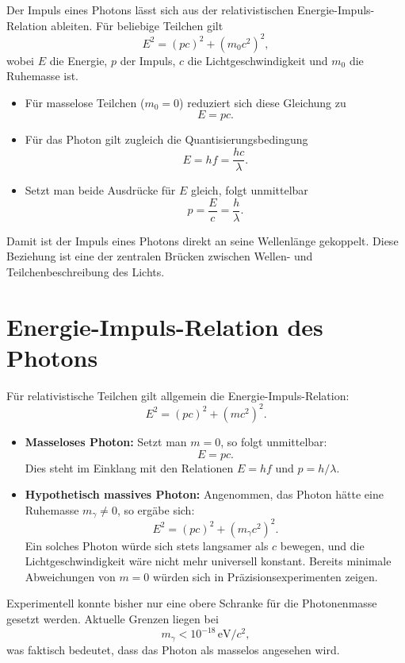 Der Impuls eines Photons lässt sich aus der relativistischen Energie-Impuls-Relation ableiten. Für beliebige Teilchen gilt
\[
E^2 = (pc)^2 + (m_0 c^2)^2 ,
\]
wobei $E$ die Energie, $p$ der Impuls, $c$ die Lichtgeschwindigkeit und $m_0$ die Ruhemasse ist.

\begin{itemize}
	\item Für masselose Teilchen ($m_0 = 0$) reduziert sich diese Gleichung zu
	\[
	E = p c.
	\]
	
	\item Für das Photon gilt zugleich die Quantisierungsbedingung
	\[
	E = h f = \frac{h c}{\lambda}.
	\]
	
	\item Setzt man beide Ausdrücke für $E$ gleich, folgt unmittelbar
	\[
	p = \frac{E}{c} = \frac{h}{\lambda}.
	\]
\end{itemize}

\noindent
Damit ist der Impuls eines Photons direkt an seine Wellenlänge gekoppelt. Diese Beziehung ist eine der zentralen Brücken zwischen Wellen- und Teilchenbeschreibung des Lichts.

\section{Energie-Impuls-Relation des Photons}
\label{anhangA:masse}

Für relativistische Teilchen gilt allgemein die Energie-Impuls-Relation:
\[
E^2 = (pc)^2 + (m c^2)^2.
\]

\begin{itemize}
	\item \textbf{Masseloses Photon:}  
	Setzt man $m=0$, so folgt unmittelbar:
	\[
	E = p c.
	\]
	Dies steht im Einklang mit den Relationen $E = h f$ und $p = h/\lambda$.
	
	\item \textbf{Hypothetisch massives Photon:}  
	Angenommen, das Photon hätte eine Ruhemasse $m_\gamma \neq 0$, so ergäbe sich:
	\[
	E^2 = (p c)^2 + (m_\gamma c^2)^2.
	\]
	Ein solches Photon würde sich stets langsamer als $c$ bewegen, und die Lichtgeschwindigkeit wäre nicht mehr universell konstant. 
	Bereits minimale Abweichungen von $m=0$ würden sich in Präzisionsexperimenten zeigen.
\end{itemize}

Experimentell konnte bisher nur eine obere Schranke für die Photonenmasse gesetzt werden. Aktuelle Grenzen liegen bei
\[
m_\gamma < 10^{-18}\,\text{eV}/c^2,
\]
was faktisch bedeutet, dass das Photon als masselos angesehen wird.


